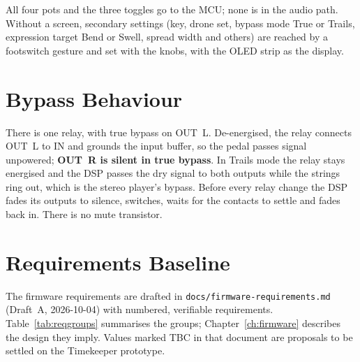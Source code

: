 All four pots and the three toggles go to the MCU; none is in the audio path. Without a screen, secondary settings (key, drone set, bypass mode True or Trails, expression target Bend or Swell, spread width and others) are reached by a footswitch gesture and set with the knobs, with the OLED strip as the display.

\section{Bypass Behaviour}
There is one relay, with true bypass on OUT~L. De-energised, the relay connects OUT~L to IN and grounds the input buffer, so the pedal passes signal unpowered; \textbf{OUT~R is silent in true bypass}. In Trails mode the relay stays energised and the DSP passes the dry signal to both outputs while the strings ring out, which is the stereo player's bypass. Before every relay change the DSP fades its outputs to silence, switches, waits for the contacts to settle and fades back in. There is no mute transistor.

\section{Requirements Baseline}
The firmware requirements are drafted in \texttt{docs/firmware-requirements.md} (Draft~A, 2026-10-04) with numbered, verifiable requirements. Table~\ref{tab:reqgroups} summarises the groups; Chapter~\ref{ch:firmware} describes the design they imply. Values marked TBC in that document are proposals to be settled on the Timekeeper prototype.

